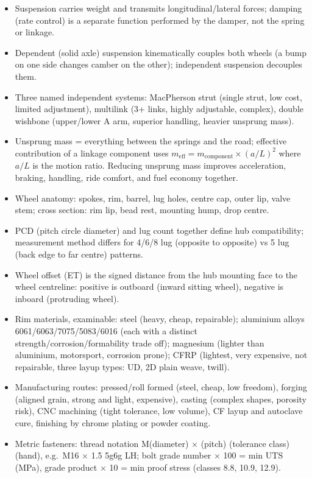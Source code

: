 \documentclass[10pt,a4paper]{article}
\begin{document}
\begin{itemize}
\item Suspension carries weight and transmits longitudinal/lateral forces; damping (rate control) is a separate function performed by the damper, not the spring or linkage.
\item Dependent (solid axle) suspension kinematically couples both wheels (a bump on one side changes camber on the other); independent suspension decouples them.
\item Three named independent systems: MacPherson strut (single strut, low cost, limited adjustment), multilink (3+ links, highly adjustable, complex), double wishbone (upper/lower A arm, superior handling, heavier unsprung mass).
\item Unsprung mass = everything between the springs and the road; effective contribution of a linkage component uses $m_{\text{eff}} = m_{\text{component}} \times (a/L)^2$ where $a/L$ is the motion ratio. Reducing unsprung mass improves acceleration, braking, handling, ride comfort, and fuel economy together.
\item Wheel anatomy: spokes, rim, barrel, lug holes, centre cap, outer lip, valve stem; cross section: rim lip, bead rest, mounting hump, drop centre.
\item PCD (pitch circle diameter) and lug count together define hub compatibility; measurement method differs for 4/6/8 lug (opposite to opposite) vs 5 lug (back edge to far centre) patterns.
\item Wheel offset (ET) is the signed distance from the hub mounting face to the wheel centreline: positive is outboard (inward sitting wheel), negative is inboard (protruding wheel).
\item Rim materials, examinable: steel (heavy, cheap, repairable); aluminium alloys 6061/6063/7075/5083/6016 (each with a distinct strength/corrosion/formability trade off); magnesium (lighter than aluminium, motorsport, corrosion prone); CFRP (lightest, very expensive, not repairable, three layup types: UD, 2D plain weave, twill).
\item Manufacturing routes: pressed/roll formed (steel, cheap, low freedom), forging (aligned grain, strong and light, expensive), casting (complex shapes, porosity risk), CNC machining (tight tolerance, low volume), CF layup and autoclave cure, finishing by chrome plating or powder coating.
\item Metric fasteners: thread notation M(diameter) $\times$ (pitch) (tolerance class)(hand), e.g.\ M16 $\times$ 1.5 5g6g LH; bolt grade number $\times$ 100 = min UTS (MPa), grade product $\times$ 10 = min proof stress (classes 8.8, 10.9, 12.9).

\end{itemize}
\end{document}
